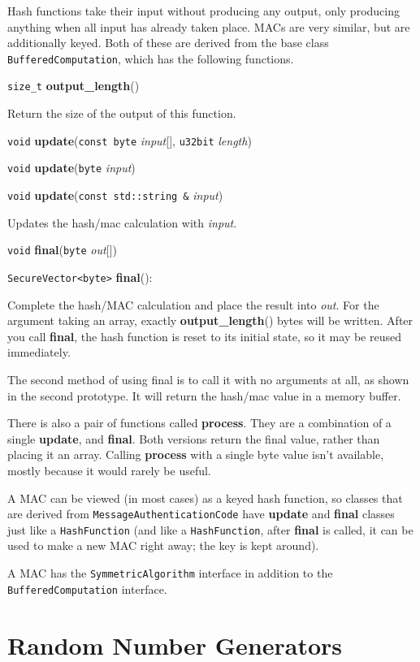 \documentclass{article}
\newcommand{\function}[1]{\textbf{#1}}
\newcommand{\type}[1]{\texttt{#1}}
\renewcommand{\arg}[1]{\textsl{#1}}
\begin{document}
Hash functions take their input without producing any output, only producing
anything when all input has already taken place. MACs are very similar, but are
additionally keyed. Both of these are derived from the base class
\type{BufferedComputation}, which has the following functions.

\noindent
\type{size\_t} \function{output\_length}()

Return the size of the output of this function.

\type{void} \function{update}(\type{const byte} \arg{input}[], \type{u32bit}
\arg{length})

\noindent
\type{void} \function{update}(\type{byte} \arg{input})

\noindent
\type{void} \function{update}(\type{const std::string \&} \arg{input})

Updates the hash/mac calculation with \arg{input}.

\noindent
\type{void} \function{final}(\type{byte} \arg{out}[])

\noindent
\type{SecureVector<byte>} \function{final}():

Complete the hash/MAC calculation and place the result into \arg{out}.
For the argument taking an array, exactly \function{output\_length}()
bytes will be written. After you call \function{final}, the hash
function is reset to its initial state, so it may be reused
immediately.

The second method of using final is to call it with no arguments at
all, as shown in the second prototype. It will return the hash/mac
value in a memory buffer.

There is also a pair of functions called \function{process}. They are
a combination of a single \function{update}, and \function{final}.
Both versions return the final value, rather than placing it an
array. Calling \function{process} with a single byte value isn't
available, mostly because it would rarely be useful.

A MAC can be viewed (in most cases) as a keyed hash function, so
classes that are derived from \type{MessageAuthenticationCode} have
\function{update} and \function{final} classes just like a
\type{HashFunction} (and like a \type{HashFunction}, after
\function{final} is called, it can be used to make a new MAC right
away; the key is kept around).

A MAC has the \type{SymmetricAlgorithm} interface in addition to the
\type{BufferedComputation} interface.

\section{Random Number Generators}
\end{document}
